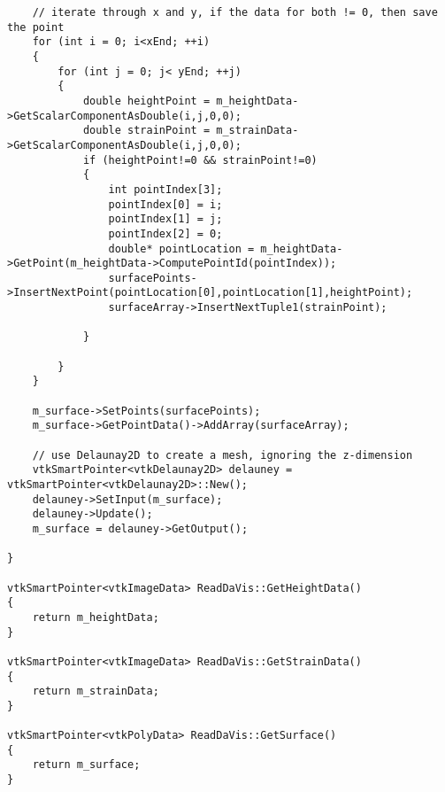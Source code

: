 \begin{lstlisting}
    // iterate through x and y, if the data for both != 0, then save the point
    for (int i = 0; i<xEnd; ++i)
    {
        for (int j = 0; j< yEnd; ++j)
        {
            double heightPoint = m_heightData->GetScalarComponentAsDouble(i,j,0,0);
            double strainPoint = m_strainData->GetScalarComponentAsDouble(i,j,0,0);
            if (heightPoint!=0 && strainPoint!=0)
            {
                int pointIndex[3];
                pointIndex[0] = i;
                pointIndex[1] = j;
                pointIndex[2] = 0;
                double* pointLocation = m_heightData->GetPoint(m_heightData->ComputePointId(pointIndex));
                surfacePoints->InsertNextPoint(pointLocation[0],pointLocation[1],heightPoint);
                surfaceArray->InsertNextTuple1(strainPoint);

            }

        }
    }

    m_surface->SetPoints(surfacePoints);
    m_surface->GetPointData()->AddArray(surfaceArray);

    // use Delaunay2D to create a mesh, ignoring the z-dimension
    vtkSmartPointer<vtkDelaunay2D> delauney = vtkSmartPointer<vtkDelaunay2D>::New();
    delauney->SetInput(m_surface);
    delauney->Update();
    m_surface = delauney->GetOutput();

}

vtkSmartPointer<vtkImageData> ReadDaVis::GetHeightData()
{
    return m_heightData;
}

vtkSmartPointer<vtkImageData> ReadDaVis::GetStrainData()
{
    return m_strainData;
}

vtkSmartPointer<vtkPolyData> ReadDaVis::GetSurface()
{
    return m_surface;
}
\end{lstlisting}
